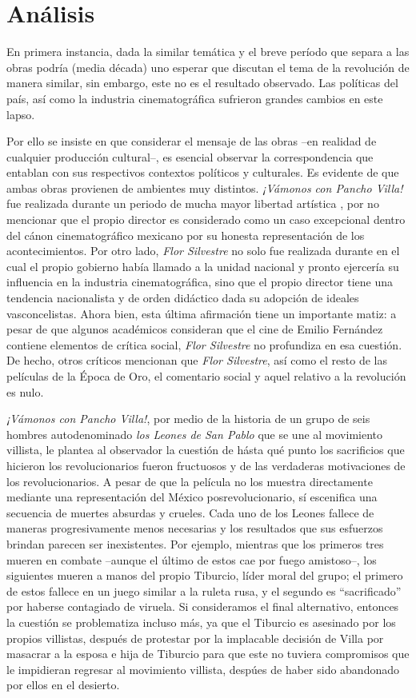 \section{Análisis}
En primera instancia, dada la similar temática y el breve período que separa a las obras podría (media década) uno esperar que discutan el tema de la revolución de manera similar, sin embargo, este no es el resultado observado.
Las políticas del país, así como la industria cinematográfica sufrieron grandes cambios en este lapso. 

Por ello se insiste en que considerar el mensaje de las obras --en realidad de cualquier producción cultural--, es esencial observar la correspondencia que entablan con sus respectivos contextos políticos y culturales. 
Es evidente de que ambas obras provienen de ambientes muy distintos. \textit{¡Vámonos con Pancho Villa!} fue realizada durante un periodo de mucha mayor libertad artística %
, por no mencionar que el propio director es considerado como un caso excepcional dentro del cánon cinematográfico mexicano por su honesta representación de los acontecimientos. %
Por otro lado, \textit{Flor Silvestre} no solo fue realizada durante en el cual el propio gobierno había llamado a la unidad nacional y pronto ejercería su influencia en la industria cinematográfica, sino que el propio director tiene una tendencia nacionalista y de orden didáctico dada su adopción de ideales vasconcelistas. 
Ahora bien, esta última afirmación tiene un importante matiz: a pesar de que algunos académicos consideran que el cine de Emilio Fernández contiene elementos de crítica social, \textit{Flor Silvestre} no profundiza en esa cuestión. 
De hecho, otros críticos mencionan que  \textit{Flor Silvestre}, así como el resto de las películas de la Época de Oro, el comentario social y aquel relativo a la revolución es nulo. %


\textit{¡Vámonos con Pancho Villa!}, por medio de la historia de un grupo de seis hombres autodenominado \textit{los Leones de San Pablo} que se une al movimiento villista, le plantea al observador la cuestión de hásta qué punto los sacrificios que hicieron los revolucionarios fueron fructuosos y de las verdaderas motivaciones de los revolucionarios. 
A pesar de que la película no los muestra directamente mediante una representación del México posrevolucionario, sí escenifica una secuencia de muertes absurdas y crueles. Cada uno de los Leones fallece de maneras progresivamente menos necesarias y los resultados que sus esfuerzos brindan parecen ser inexistentes. 
Por ejemplo, mientras que los primeros tres mueren en combate --aunque el último de estos cae por fuego amistoso--, los siguientes mueren a manos del propio Tiburcio, líder moral del grupo; el primero de estos fallece en un juego similar a la ruleta rusa, y el segundo es ``sacrificado'' por haberse contagiado de viruela. Si consideramos el final alternativo, entonces la cuestión se problematiza incluso más, ya que el Tiburcio es asesinado por los propios villistas, después de protestar por la implacable decisión de Villa por masacrar a la esposa e hija de Tiburcio para que este no tuviera compromisos que le impidieran regresar al movimiento villista, despúes de haber sido abandonado por ellos en el desierto. 

